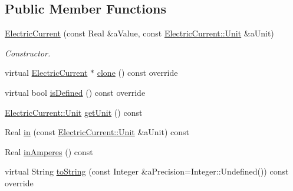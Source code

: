 \subsection*{Public Member Functions}
\begin{DoxyCompactItemize}
\item 
\hyperlink{classostk_1_1physics_1_1units_1_1_electric_current_af247c4dcd830d2c20f4ba20fdca555a7}{Electric\+Current} (const Real \&a\+Value, const \hyperlink{classostk_1_1physics_1_1units_1_1_electric_current_ac57c87a7533dc73b87185b0d9ae6985b}{Electric\+Current\+::\+Unit} \&a\+Unit)
\begin{DoxyCompactList}\small\item\em Constructor. \end{DoxyCompactList}\item 
virtual \hyperlink{classostk_1_1physics_1_1units_1_1_electric_current}{Electric\+Current} $\ast$ \hyperlink{classostk_1_1physics_1_1units_1_1_electric_current_ac8a261411dee39c74bc43201e8e9c9dd}{clone} () const override
\item 
virtual bool \hyperlink{classostk_1_1physics_1_1units_1_1_electric_current_a81ae490a737a49553a7c390b865486a7}{is\+Defined} () const override
\item 
\hyperlink{classostk_1_1physics_1_1units_1_1_electric_current_ac57c87a7533dc73b87185b0d9ae6985b}{Electric\+Current\+::\+Unit} \hyperlink{classostk_1_1physics_1_1units_1_1_electric_current_a3710fc8f80441eee27bc952ff35a84cd}{get\+Unit} () const
\item 
Real \hyperlink{classostk_1_1physics_1_1units_1_1_electric_current_a8ad14eb9b06b85b372307da5de177899}{in} (const \hyperlink{classostk_1_1physics_1_1units_1_1_electric_current_ac57c87a7533dc73b87185b0d9ae6985b}{Electric\+Current\+::\+Unit} \&a\+Unit) const
\item 
Real \hyperlink{classostk_1_1physics_1_1units_1_1_electric_current_a8f85bb1ad0cac0edaeef92988e66d08b}{in\+Amperes} () const
\item 
virtual String \hyperlink{classostk_1_1physics_1_1units_1_1_electric_current_aa720f442c93f18f81ad769edbd570bd5}{to\+String} (const Integer \&a\+Precision=Integer\+::\+Undefined()) const override
\end{DoxyCompactItemize}

